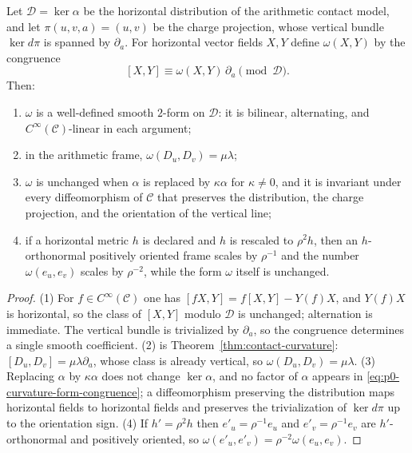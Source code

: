 \begin{proposition}
\label{prop:p0-curvature-form}
Let $\mathcal D=\ker\alpha$ be the horizontal distribution of the arithmetic
contact model, and let $\pi(u,v,a)=(u,v)$ be the charge projection, whose
vertical bundle $\ker d\pi$ is spanned by $\partial_a$.  For horizontal vector
fields $X,Y$ define $\omega(X,Y)$ by the congruence
\begin{equation}\label{eq:p0-curvature-form-congruence}
  [X,Y]\equiv\omega(X,Y)\,\partial_a \pmod{\mathcal D} .
\end{equation}
Then:
\begin{enumerate}
  \item $\omega$ is a well-defined smooth $2$-form on $\mathcal D$: it is
  bilinear, alternating, and $C^\infty(\mathcal C)$-linear in each argument;
  \item in the arithmetic frame, $\omega(D_u,D_v)=\mu\lambda$;
  \item $\omega$ is unchanged when $\alpha$ is replaced by $\kappa\alpha$ for
  $\kappa\ne0$, and it is invariant under every diffeomorphism of $\mathcal C$
  that preserves the distribution, the charge projection, and the orientation of
  the vertical line;
  \item if a horizontal metric $h$ is declared and $h$ is rescaled to $\rho^2h$,
  then an $h$-orthonormal positively oriented frame scales by $\rho^{-1}$ and the
  number $\omega(e_u,e_v)$ scales by $\rho^{-2}$, while the form $\omega$ itself
  is unchanged.
\end{enumerate}
\end{proposition}

\begin{proof}
(1) For $f\in C^\infty(\mathcal C)$ one has $[fX,Y]=f[X,Y]-Y(f)X$, and $Y(f)X$
is horizontal, so the class of $[X,Y]$ modulo $\mathcal D$ is unchanged;
alternation is immediate.  The vertical bundle is trivialized by $\partial_a$,
so the congruence determines a single smooth coefficient.  (2) is
Theorem~\ref{thm:contact-curvature}: $[D_u,D_v]=\mu\lambda\partial_a$, whose
class is already vertical, so $\omega(D_u,D_v)=\mu\lambda$.  (3) Replacing
$\alpha$ by $\kappa\alpha$ does not change $\ker\alpha$, and no factor of
$\alpha$ appears in \eqref{eq:p0-curvature-form-congruence}; a diffeomorphism
preserving the distribution maps horizontal fields to horizontal fields and
preserves the trivialization of $\ker d\pi$ up to the orientation sign.  (4) If
$h'=\rho^2h$ then $e'_u=\rho^{-1}e_u$ and $e'_v=\rho^{-1}e_v$ are
$h'$-orthonormal and positively oriented, so
$\omega(e'_u,e'_v)=\rho^{-2}\omega(e_u,e_v)$.
\end{proof}

